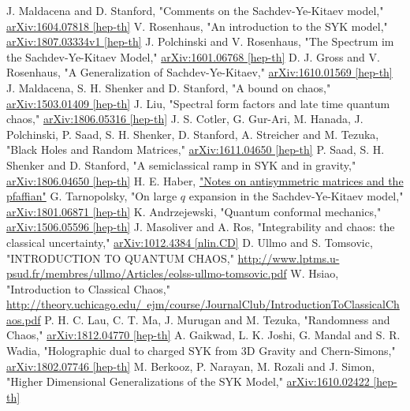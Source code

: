 \begin{thebibliography}{99}
		J. Maldacena and D. Stanford,
		"Comments on the Sachdev-Ye-Kitaev model,"
		\href{https://arxiv.org/pdf/1604.07818.pdf}{arXiv:1604.07818 [hep-th]}
		V. Rosenhaus,
		"An introduction to the SYK model,"
		\href{https://arxiv.org/pdf/1807.03334.pdf}{arXiv:1807.03334v1 [hep-th]}
		J. Polchinski and V. Rosenhaus,
		"The Spectrum im the Sachdev-Ye-Kitaev Model,"
		\href{https://arxiv.org/pdf/1601.06768.pdf}{arXiv:1601.06768 [hep-th]}
		D. J. Gross and V. Rosenhaus,
		"A Generalization of Sachdev-Ye-Kitaev,"
		\href{https://arxiv.org/pdf/1610.01569.pdf}{arXiv:1610.01569 [hep-th]}
		J. Maldacena, S. H. Shenker and D. Stanford,
		"A bound on chaos,"
		\href{https://arxiv.org/pdf/1503.01409.pdf}{arXiv:1503.01409 [hep-th]}
		J. Liu,
		"Spectral form factors and late time quantum chaos,"
		\href{https://arxiv.org/pdf/1806.05316.pdf}{arXiv:1806.05316 [hep-th]}
		J. S. Cotler, G. Gur-Ari, M. Hanada, J. Polchinski, P. Saad, S. H. Shenker,
		D. Stanford, A. Streicher and M. Tezuka,
		"Black Holes and Random Matrices,"
		\href{https://arxiv.org/pdf/1611.04650.pdf}{arXiv:1611.04650 [hep-th]}
		P. Saad, S. H. Shenker and D. Stanford,
		"A semiclassical ramp in SYK and in gravity,"
		\href{https://arxiv.org/pdf/1806.06840.pdf}{arXiv:1806.04650 [hep-th]}
	H. E. Haber,
	\href{http://scipp.ucsc.edu/~haber/webpage/pfaffian2.pdf}{"Notes on antisymmetric matrices and the pfaffian"}
		G. Tarnopolsky,
		"On large $q$ expansion in the Sachdev-Ye-Kitaev model,"
		\href{https://arxiv.org/pdf/1801.06871.pdf}{arXiv:1801.06871 [hep-th]}
		K. Andrzejewski,
		"Quantum conformal mechanics,"
		\href{https://arxiv.org/pdf/1506.05596.pdf}{arXiv:1506.05596 [hep-th]}
	J. Masoliver and A. Ros,
	"Integrability and chaos: the classical uncertainty,"
	\href{https://arxiv.org/pdf/1012.4384.pdf}{arXiv:1012.4384 [nlin.CD]}
	D. Ullmo and S. Tomsovic,
	"INTRODUCTION TO QUANTUM CHAOS,"
	\href{http://www.lptms.u-psud.fr/membres/ullmo/Articles/eolss-ullmo-tomsovic.pdf}{http://www.lptms.u-psud.fr/membres/ullmo/Articles/eolss-ullmo-tomsovic.pdf}
	W. Hsiao,
	"Introduction to Classical Chaos,"
	\href{http://theory.uchicago.edu/~ejm/course/JournalClub/IntroductionToClassicalChaos.pdf}{http://theory.uchicago.edu/~ejm/course/JournalClub/IntroductionToClassicalChaos.pdf}
	P. H. C. Lau, C. T. Ma, J. Murugan and M. Tezuka,
	"Randomness and Chaos,"
	\href{https://arxiv.org/pdf/1812.04770.pdf}{arXiv:1812.04770 [hep-th]}
	A. Gaikwad, L. K. Joshi, G. Mandal and S. R. Wadia,
	"Holographic dual to charged SYK from 3D Gravity and Chern-Simons,"
	\href{https://arxiv.org/pdf/1802.07746.pdf}{arXiv:1802.07746 [hep-th]}
	M. Berkooz, P. Narayan, M. Rozali and J. Simon,
	"Higher Dimensional Generalizations of the SYK Model,"
	\href{https://arxiv.org/pdf/1610.02422.pdf}{arXiv:1610.02422 [hep-th]}
\end{thebibliography}
